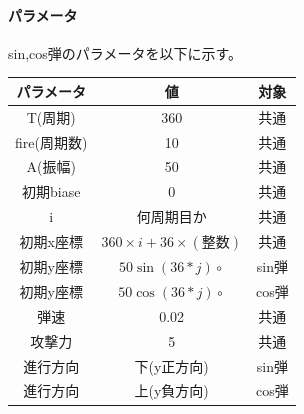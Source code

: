 \documentclass[a4paper,titlepage,11pt]{ltjsarticle}
\begin{document}
\paragraph{パラメータ}
sin,cos弾のパラメータを以下に示す。
\begin{table}[H]
	\centering
	\begin{tabular}{|c|c|c|}
		\hline 
		パラメータ & 値 & 対象 \\ \hline \hline
		T(周期) & 360 & 共通 \\ \hline
		fire(周期数) & 10 & 共通 \\ \hline
		A(振幅) & 50 & 共通 \\ \hline
		初期biase & 0 & 共通 \\ \hline
		i & 何周期目か & 共通 \\ \hline
		初期x座標 & $360 \times i + 36 \times (整数)$ & 共通 \\ \hline
		初期y座標 & $50\sin(36 * j)\circ$ & sin弾 \\ \hline
		初期y座標 & $50\cos(36 * j)\circ$ & cos弾 \\ \hline
		弾速 & 0.02 & 共通 \\ \hline
		攻撃力 & 5 & 共通 \\ \hline
		進行方向 & 下(y正方向) & sin弾 \\ \hline
		進行方向 & 上(y負方向) & cos弾 \\ \hline
	\end{tabular}
\end{table}
\end{document}
